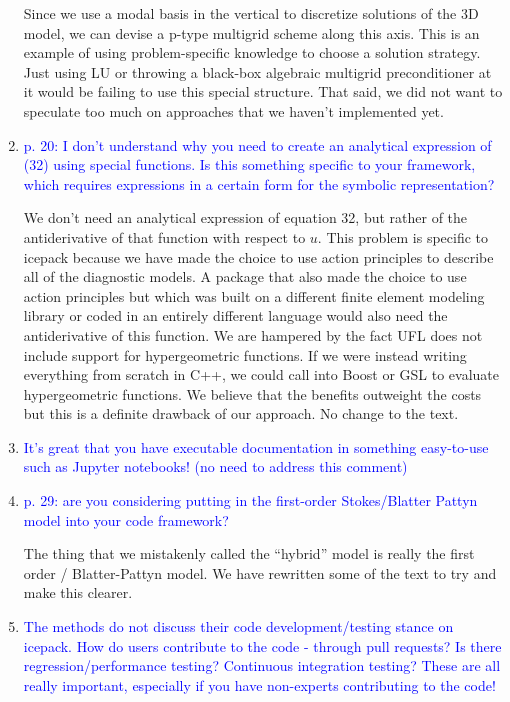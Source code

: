 \documentclass{article}
\theoremstyle{definition}
\theoremstyle{plain}
\begin{document}
\begin{enumerate}
Since we use a modal basis in the vertical to discretize solutions of the 3D model, we can devise a p-type multigrid scheme along this axis.
This is an example of using problem-specific knowledge to choose a solution strategy.
Just using LU or throwing a black-box algebraic multigrid preconditioner at it would be failing to use this special structure.
That said, we did not want to speculate too much on approaches that we haven't implemented yet.

\item \textcolor{blue}{p. 20: I don't understand why you need to create an analytical expression of (32) using special
functions. Is this something specific to your framework, which requires expressions in a certain form
for the symbolic representation?}

We don't need an analytical expression of equation 32, but rather of the antiderivative of that function with respect to $u$.
This problem is specific to icepack because we have made the choice to use action principles to describe all of the diagnostic models.
A package that also made the choice to use action principles but which was built on a different finite element modeling library or coded in an entirely different language would also need the antiderivative of this function.
We are hampered by the fact UFL does not include support for hypergeometric functions.
If we were instead writing everything from scratch in C++, we could call into Boost or GSL to evaluate hypergeometric functions.
We believe that the benefits outweight the costs but this is a definite drawback of our approach.
No change to the text.

\item \textcolor{blue}{It's great that you have executable documentation in something easy-to-use such as Jupyter notebooks! (no need to address this comment)}
\item \textcolor{blue}{p. 29: are you considering putting in the first-order Stokes/Blatter Pattyn model into your code
framework?}

The thing that we mistakenly called the ``hybrid'' model is really the first order / Blatter-Pattyn model.
We have rewritten some of the text to try and make this clearer.

\item \textcolor{blue}{The methods do not discuss their code development/testing stance on icepack. How do users contribute to the code - through pull requests? Is there regression/performance testing? Continuous
integration testing? These are all really important, especially if you have non-experts contributing
to the code!}


\end{enumerate}
\end{document}
